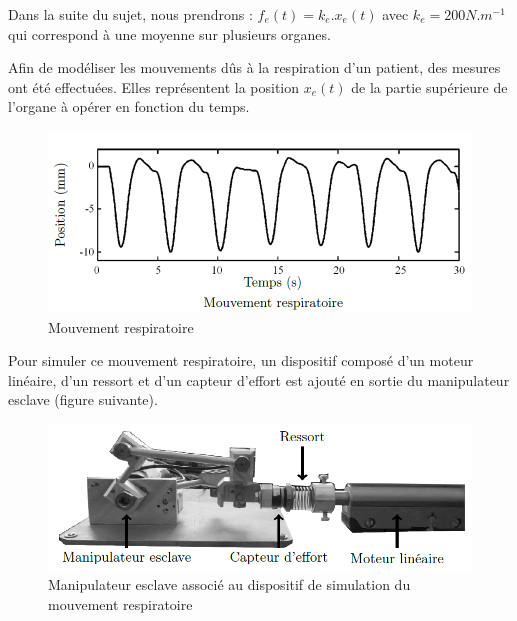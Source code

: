 
Dans la suite du sujet, nous prendrons : $f_e(t)=k_e.x_e(t)$ avec $k_e=200N.m^{-1}$ qui correspond à une moyenne sur plusieurs organes.

Afin de modéliser les mouvements dûs à la respiration d'un patient, des mesures ont été effectuées. Elles représentent la position $x_e(t)$ de la partie supérieure de l'organe à opérer en fonction du temps.

\begin{figure}[ht!]
\begin{center}
 \includegraphics[width=0.7\linewidth]{img/Figure14}
\end{center}
\caption{Mouvement respiratoire}
\label{fig14}
\end{figure}


Pour simuler ce mouvement respiratoire, un dispositif composé d'un moteur linéaire, d'un ressort et d'un capteur d'effort est ajouté en sortie du manipulateur esclave (figure suivante).

\begin{figure}[ht!]
\begin{center}
 \includegraphics[width=0.7\linewidth]{img/Figure15}
\end{center}
\caption{Manipulateur esclave associé au dispositif de simulation du mouvement respiratoire}
\label{fig15}
\end{figure}

